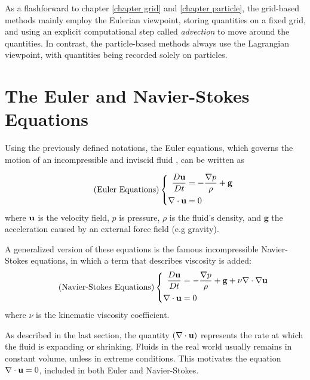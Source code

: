 As a flashforward to chapter \ref{chapter grid} and \ref{chapter particle}, the grid-based methods mainly employ the Eulerian viewpoint, storing quantities on a fixed grid, and using an explicit computational step called \textit{advection} to move around the quantities. In contrast, the particle-based methods always use the Lagrangian viewpoint, with quantities being recorded solely on particles.










\section{The Euler and Navier-Stokes Equations}
\label{Euler N-S Eqns}

Using the previously defined notations, the Euler equations, which governs the motion of an incompressible and inviscid fluid
, can be written as

\begin{equation}
    \tag{Euler Equations}
    \left \{
    \begin{aligned}
         \frac{D\textbf{u}}{Dt}   &=   -\frac{\nabla p}{\rho} + \textbf{g} \\
         \nabla \cdot \textbf{u}   &=   0
    \end{aligned} \right.
    \label{eqn:Euler Equations}
\end{equation} 
where $\textbf{u}$ is the velocity field, $p$ is pressure, $\rho$ is the fluid's density, and $\textbf{g}$ the acceleration caused by an external force field (e.g gravity).

A generalized version of these equations is the famous incompressible Navier-Stokes equations, in which a term that describes viscosity is added:
\begin{equation}
    \tag{Navier-Stokes Equations}
    \left \{
    \begin{aligned}
         \frac{D\textbf{u}}{Dt}   &=   -\frac{\nabla p}{\rho} + \textbf{g} + \nu \nabla \cdot \nabla \textbf{u} \\
         \nabla \cdot \textbf{u}  &=   0
    \end{aligned} \right.
    \label{eqn:Navier-Stokes Equations}
\end{equation} 
where $\nu$ is the kinematic viscosity coefficient.


As described in the last section, the quantity $(\nabla \cdot \textbf{u})$ represents the rate at which the fluid is expanding or shrinking. Fluids in the real world usually remains in constant volume, unless in extreme conditions. This motivates the equation $\nabla \cdot \textbf{u} = 0$, included in both Euler and Navier-Stokes.


